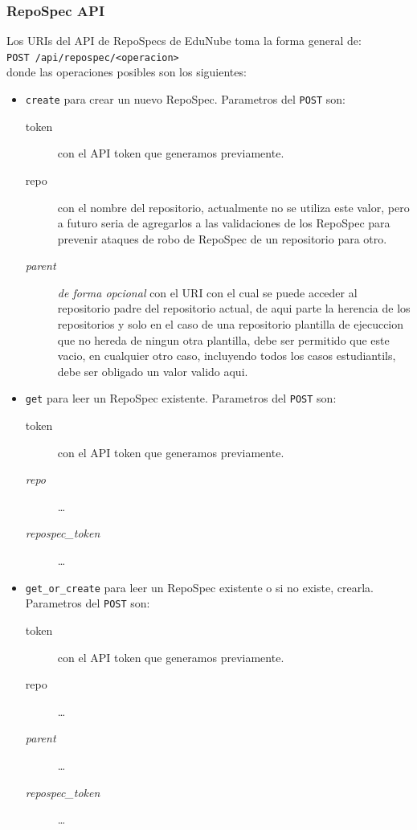 \subsubsection{RepoSpec API}
Los URIs del API de RepoSpecs de EduNube toma la forma general de: \\
\texttt{POST /api/repospec/<operacion>} \\
donde las operaciones posibles son los siguientes:
\begin{itemize}
	\item \texttt{create} para crear un nuevo RepoSpec. Parametros del \texttt{POST} son:
    \begin{description}
    	\item[token] con el API token que generamos previamente.
        \item[repo] con el nombre del repositorio, actualmente no se utiliza este valor, pero a futuro seria de agregarlos a las validaciones de los RepoSpec para prevenir ataques de robo de RepoSpec de un repositorio para otro.
        \item[\textit{parent}] \textit{de forma opcional} con el URI con el cual se puede acceder al repositorio padre del repositorio actual, de aqui parte la herencia de los repositorios y solo en el caso de una repositorio plantilla de ejecuccion que no hereda de ningun otra plantilla, debe ser permitido que este vacio, en cualquier otro caso, incluyendo todos los casos estudiantils, debe ser obligado un valor valido aqui.
    \end{description}
    \item \texttt{get} para leer un RepoSpec existente. Parametros del \texttt{POST} son:
    \begin{description}
    	\item[token] con el API token que generamos previamente.
        \item[\textit{repo}] \ldots
        \item[\textit{repospec\_token}] \ldots
    \end{description}
    \item \texttt{get\_or\_create} para leer un RepoSpec existente o si no existe, crearla. Parametros del \texttt{POST} son:
    \begin{description}
    	\item[token] con el API token que generamos previamente.
        \item[repo] \ldots
        \item[\textit{parent}] \ldots
        \item[\textit{repospec\_token}] \ldots

\end{description}
\end{itemize}
